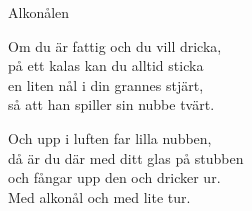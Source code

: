 \begin{song}{Alkonålen}
	
	
	
	Om du är fattig och du vill dricka,\\
	på ett kalas kan du alltid sticka\\
	en liten nål i din grannes stjärt,\\
	så att han spiller sin nubbe tvärt.
	
	Och upp i luften far lilla nubben,\\
	då är du där med ditt glas på stubben\\
	och fångar upp den och dricker ur.\\
	Med alkonål och med lite tur.
	
\end{song}
